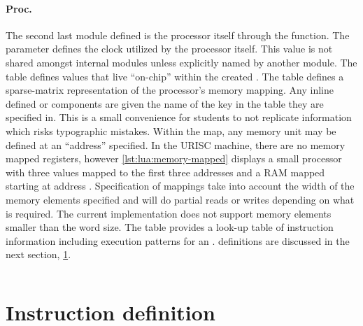 \begin{listing}[h!]
    \inputminted[escapeinside=||, firstline=35, lastline=42]{lua}{./listings/urisc.lua}
    \caption{Memory unit configuration for the program counter (cut from \cref{lst:lua:urisc-example-1}).}
    \label{lst:lua:urisc:memory}
\end{listing}

\paragraph{Proc.} The second last module defined is the processor itself through the  function. The  parameter defines the clock utilized by the processor itself. This value is not shared amongst internal modules unless explicitly named by another module. The  table defines  values that live ``on-chip'' within the created . The  table defines a sparse-matrix representation of the processor's memory mapping. Any inline defined  or  components are given the name of the key in the table they are specified in. This is a small convenience for students to not replicate information which risks typographic mistakes. Within the  map, any memory unit may be defined at an ``address'' specified. In the URISC machine, there are no memory mapped registers, however \cref{lst:lua:memory-mapped} displays a small processor with three  values mapped to the first three addresses and a RAM mapped starting at address . Specification of  mappings take into account the width of the memory elements specified and will do partial reads or writes depending on what is required. The current implementation does not support memory elements smaller than the word size. The  table provides a look-up table of instruction information including execution patterns for an .  definitions are discussed in the next section, \cref{sec:lua:sec:instructions}.

\begin{listing}[hp!]
    \inputminted[escapeinside=||]{lua}{./listings/memory-mapping.lua}
    \caption{Processor utilizing memory mapping functionality.}
    \label{lst:lua:memory-mapped}
\end{listing}

\section{Instruction definition}
\label{sec:lua:sec:instructions}

